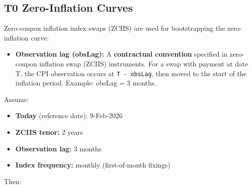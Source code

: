 \documentclass[11pt,a4paper]{article}
\newcommand{\code}[1]{\texttt{#1}}
\begin{document}
\subsection{T0 Zero-Inflation Curves}

Zero-coupon inflation index swaps (ZCIIS) are used for bootstrapping the zero-inflation curve:

\begin{itemize}[leftmargin=*]
\item \textbf{Observation lag (obsLag):} A \textbf{contractual convention} specified in zero-coupon inflation swap (ZCIIS) instruments. For a swap with payment at date T, the CPI observation occurs at \code{T - obsLag}, then moved to the start of the inflation period. Example: obsLag = 3 months.
\end{itemize}

Assume:
\begin{itemize}
\item \textbf{Today} (reference date): 9-Feb-2026
\item \textbf{ZCIIS tenor:} 2 years
\item \textbf{Observation lag:} 3 months
\item \textbf{Index frequency:} monthly (first-of-month fixings)
\end{itemize}

Then:
\end{document}

